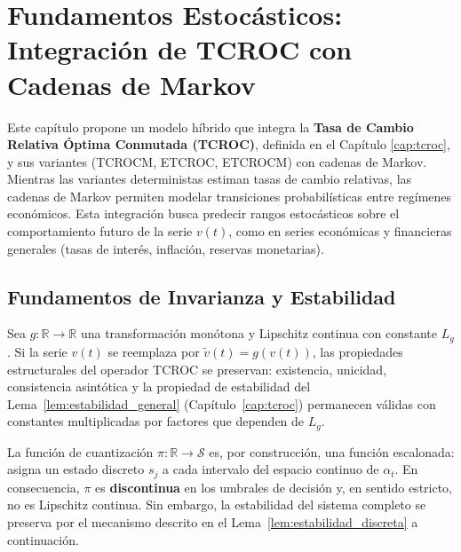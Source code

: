 \chapter[TCROC con Cadenas de Markov]{Fundamentos Estocásticos:\\ Integración de TCROC con Cadenas de Markov}
\label{cap:TCROC-Markov}

Este capítulo propone un modelo híbrido que integra la \textbf{Tasa de Cambio Relativa Óptima Conmutada (TCROC)}, definida en el Capítulo \ref{cap:tcroc}, y sus variantes (TCROCM, ETCROC, ETCROCM) con cadenas de Markov. Mientras las variantes deterministas estiman tasas de cambio relativas, las cadenas de Markov permiten modelar transiciones probabilísticas entre regímenes económicos. Esta integración busca predecir rangos estocásticos sobre el comportamiento futuro de la serie \(v(t)\), como en series económicas y financieras generales (tasas de interés, inflación, reservas monetarias).

\section{Fundamentos de Invarianza y Estabilidad}
\label{sec:fundamentos_invarianza}

\begin{theorem}
\label{thm:invarianza_transformaciones}
Sea $g\colon \mathbb{R} \to \mathbb{R}$ una transformación monótona
y Lipschitz continua con constante $L_g$.  Si la serie $v(t)$ se
reemplaza por $\tilde{v}(t) = g(v(t))$, las propiedades estructurales
del operador TCROC se preservan: existencia, unicidad, consistencia
asintótica y la propiedad de estabilidad del
Lema~\ref{lem:estabilidad_general} (Capítulo~\ref{cap:tcroc})
permanecen válidas con constantes multiplicadas por factores que
dependen de $L_g$.
\end{theorem}

\begin{remark}
\label{rem:pi_discontinua}
La función de cuantización $\pi\colon \mathbb{R} \to \mathcal{S}$
es, por construcción, una función escalonada: asigna un estado
discreto $s_j$ a cada intervalo del espacio continuo de $\alpha_t$.
En consecuencia, $\pi$ es \textbf{discontinua} en los umbrales de
decisión y, en sentido estricto, no es Lipschitz continua.  Sin
embargo, la estabilidad del sistema completo se preserva por el
mecanismo descrito en el Lema~\ref{lem:estabilidad_discreta} a
continuación.
\end{remark}

